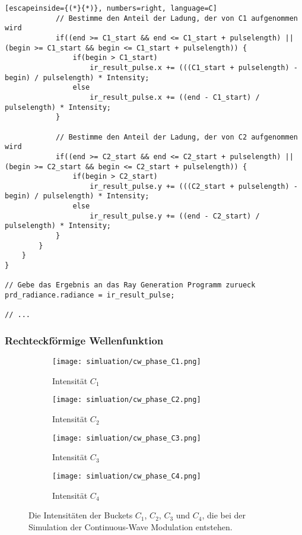 \documentclass[thesis.tex]{subfiles}
\begin{document}
\begin{lstlisting}[escapeinside={(*}{*)}, numbers=right, language=C]
            // Bestimme den Anteil der Ladung, der von C1 aufgenommen wird
            if((end >= C1_start && end <= C1_start + pulselength) || (begin >= C1_start && begin <= C1_start + pulselength)) {
                if(begin > C1_start)
                    ir_result_pulse.x += (((C1_start + pulselength) - begin) / pulselength) * Intensity;
                else
                    ir_result_pulse.x += ((end - C1_start) / pulselength) * Intensity;
            }
            
            // Bestimme den Anteil der Ladung, der von C2 aufgenommen wird
            if((end >= C2_start && end <= C2_start + pulselength) || (begin >= C2_start && begin <= C2_start + pulselength)) {
                if(begin > C2_start)
                    ir_result_pulse.y += (((C2_start + pulselength) - begin) / pulselength) * Intensity;
                else
                    ir_result_pulse.y += ((end - C2_start) / pulselength) * Intensity;
            }
        }
    }
}

// Gebe das Ergebnis an das Ray Generation Programm zurueck
prd_radiance.radiance = ir_result_pulse;

// ...
\end{lstlisting}
%
\subsubsection{Rechteckförmige Wellenfunktion}\label{sec:simulation_rectangle_tof}

\begin{figure}[ht!]
\centering
\begin{subfigure}[b]{0.24\textwidth}
\texttt{[image: simluation/cw\_phase\_C1.png]}
\caption{Intensität $C_1$}
\end{subfigure}
\begin{subfigure}[b]{0.24\textwidth}
\texttt{[image: simluation/cw\_phase\_C2.png]}
\caption{Intensität $C_2$}
\end{subfigure}
\begin{subfigure}[b]{0.24\textwidth}
\texttt{[image: simluation/cw\_phase\_C3.png]}
\caption{Intensität $C_3$}
\end{subfigure}
\begin{subfigure}[b]{0.24\textwidth}
\texttt{[image: simluation/cw\_phase\_C4.png]}
\caption{Intensität $C_4$}
\end{subfigure}
\caption{Die Intensitäten der Buckets $C_1$, $C_2$, $C_3$ und $C_4$, die bei der Simulation der Continuous-Wave Modulation entstehen.}
\label{fig:cw_modulation_intensity}
\end{figure}
\end{document}
